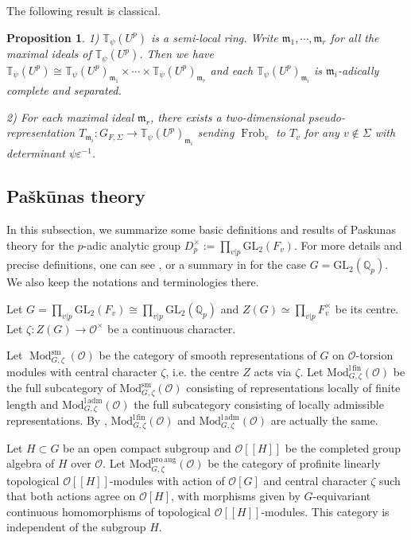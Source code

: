\documentclass[a4paper, 12pt]{amsart}
\newtheorem{prop}[thm]{Proposition}
\DeclareMathOperator{\Frob}{Frob}
\newcommand{\Q}{\mathbb{Q}}
\newcommand{\T}{\mathbb{T}}
\newcommand{\GL}{\mathrm{GL}}
\newcommand{\cO}{\mathcal{O}}
\newcommand{\km}{\mathfrak{m}}
\begin{document}
    The following result is classical.
    
    \begin{prop}\label{pseudo of T}
    	1) $\mathbb{T}_{\psi}(U^p) $ is a semi-local ring. Write $\km_1,\cdots,\km_r$ for all the maximal ideals of $\T_\psi(U^p)$. Then we have $\T_\psi(U^p)\cong \T_\psi(U^p)_{\km_1}\times\cdots\times \T_\psi(U^p)_{\km_r}$ and each $\T_\psi(U^p)_{\km_i}$ is $\km_i$-adically complete and separated. 
    	
    	2) For each maximal ideal $\km_r$, there exists a two-dimensional pseudo-representation $T_{\km_i}: G_{F, \Sigma} \to \T_\psi(U^p)_{\km_i}$ sending $\Frob_v$ to $T_v$ for any $v \notin \Sigma$ with determinant $\psi\varepsilon^{-1}$.
    \end{prop}
    
    \subsection{Pašk\=unas theory}\label{pas sec}
    
    In this subsection, we summarize some basic definitions and results of Paskunas theory for the $p$-adic analytic group $D_p^\times:=\prod_{v|p} \GL_2(F_v)$. For more details and precise definitions, one can see \cite{Pa_k_nas_2013}, \cite{Pa_k_nas_2021} or a summary in \cite[Appendix A]{Zhang:2024aa} for the case $G=\GL_2(\Q_p)$. We also keep the notations and terminologies there.
    
    Let $G=\prod_{v|p} \GL_2(F_v) \cong \prod_{v|p}\GL_2(\Q_p)$ and $Z(G)\simeq \prod_{v|p} F_v^\times$ be its centre. Let $\zeta: Z(G) \to \cO^\times $ be a continuous character.
    
    Let $\operatorname{Mod}^{\mathrm{sm}}_{G, \zeta}(\mathcal{\cO})$ be the category of smooth 
    representations of $G$ on $\mathcal{O}$-torsion modules with central character $\zeta$, i.e. the centre $Z$ acts via $\zeta$. Let $\mathrm{Mod}^{\mathrm{l\,fin}}_{G, \zeta}(\cO)$ be the full subcategory of $\mathrm{Mod}_{G, \zeta}^{\mathrm{sm}}(\cO)$ consisting of representations locally of finite length and $\mathrm{Mod}^{\mathrm{l\, adm}}_{G, \zeta} (\cO)$ the full subcategory consisting of locally admissible representations. By \cite[Lemma 3.4.1]{pan2022fontaine}, $\mathrm{Mod}^{\mathrm{l\,fin}}_{G, \zeta}(\cO)$ and $\mathrm{Mod}^{\mathrm{l\, adm}}_{G, \zeta} (\cO)$ are actually the same.
    
    Let $H \subset G$ be an open compact subgroup and $\cO[[H]]$ be the completed group algebra of $H$ over $\cO$. Let $\mathrm{Mod}_{G, \zeta}^{\mathrm{pro\,aug}}(\cO)$ be the category of profinite linearly topological $\cO[[H]]$-modules with action of $\cO[G]$ and central character $\zeta $ such that both actions agree on $\cO[H]$, with morphisms given by $G$-equivariant continuous homomorphisms of topological
    $\cO[[H]]$-modules. This category is independent of the subgroup $H$. 
    
\end{document}
